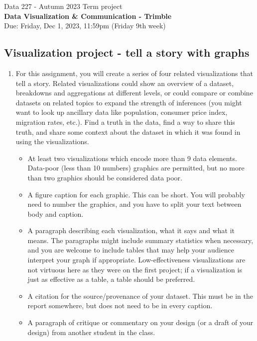 \documentclass[]{book}
\theoremstyle{definition}
\begin{document}
\begin{center}
{\Large Data 227 - Autumn 2023 \hspace{0.5cm} Term project }\\
\textbf{Data Visualization \& Communication - Trimble}\\ %
Due:  Friday, Dec 1, 2023, 11:59pm (Friday 9th week) 
\end{center}

\vspace{0.2 cm}

\subsection*{Visualization project - tell a story with graphs}

\begin{enumerate}
\item\label{norms}

For this assignment, you will create a series of four related visualizations that tell a story. Related visualizations could show an overview of a dataset, breakdowns and aggregations at different levels, or could compare or combine datasets on related topics to expand the strength of inferences (you might want to look up ancillary data like population, consumer price index, migration rates, etc.). Find a truth in the data, find a way to share this truth, and share some context about the dataset in which it was found in using the visualizations.


\begin{itemize}
\item 
At least two visualizations which encode more than 9 data elements. Data-poor (less than 10 numbers) graphics are permitted, but no more than two graphics should be considered data poor.

\item 
A figure caption for each graphic. This can be short. You will probably need to number the graphics, and you have to split your text between body and caption.
\item 
A paragraph describing each visualization, what it says and what it means. The paragraphs might include summary statistics when necessary, and you are welcome to include tables that may help your audience interpret your graph if appropriate. Low-effectiveness visualizations are not virtuous here as they were on the first project; if a visualization is just as effective as a table, a table should be preferred.
\item 
 A citation for the source/provenance of your dataset. This must be in the report somewhere, but does not need to be in every caption.
\item 
 A paragraph of critique or commentary on your design (or a draft of your design) from another student in the class.


\end{itemize}
\end{enumerate}
\end{document}
